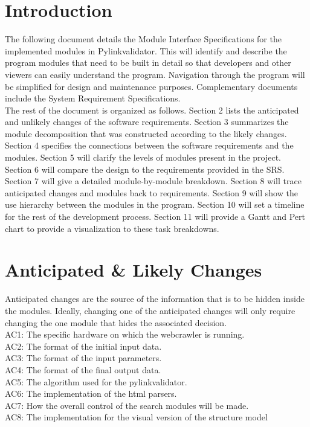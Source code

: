 \documentclass[titlepage]{article}
\begin{document}
\section{Introduction}
The following document details the Module Interface Specifications for the implemented modules in Pylinkvalidator. This will identify and describe the program modules that need to be built in detail so that developers and other viewers can easily understand the program.  Navigation through the program will be simplified for design and maintenance purposes. Complementary documents include the System Requirement Specifications.\\

The rest of the document is organized as follows. Section 2 lists the anticipated and unlikely changes of the software requirements. Section 3 summarizes the module decomposition that was constructed according to the likely changes. Section 4 specifies the connections between the software requirements and the modules. Section 5 will clarify the levels of modules present in the project. Section 6 will compare the design to the requirements provided in the SRS. Section 7 will give a detailed module-by-module breakdown. Section 8 will trace anticipated changes and modules back to requirements. Section 9 will show the use hierarchy between the modules in the program. Section 10 will set a timeline for the rest of the development process. Section 11 will provide a Gantt and Pert chart to provide a visualization to these task breakdowns.


\section{Anticipated \& Likely Changes}
Anticipated changes are the source of the information that is to be hidden inside the modules. Ideally, changing one of the anticipated changes will only require changing the one module that hides the associated decision.\\

\noindent
AC1: The specific hardware on which the webcrawler is running.\\
AC2: The format of the initial input data.\\
AC3: The format of the input parameters.\\
AC4: The format of the final output data.\\
AC5: The algorithm used for the pylinkvalidator.\\
AC6: The implementation of the html parsers.\\
AC7: How the overall control of the search modules will be made.\\
AC8: The implementation for the visual version of the structure model\\
\end{document}
